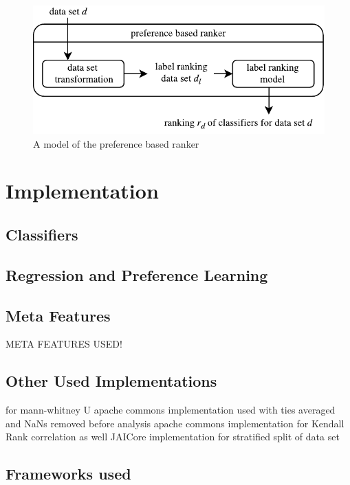 \begin{figure}
\centering
\includegraphics[scale=1]{gfx/label_ranking_model.pdf}
\caption{A model of the preference based ranker}
\label{fig:preference_ranker_model}
\end{figure}

\section{Implementation}

\subsection{Classifiers}

\subsection{Regression and Preference Learning}

\subsection{Meta Features}
META FEATURES USED! \cite{OpenML2013}

\subsection{Other Used Implementations}
for mann-whitney U apache commons implementation used with ties averaged and NaNs removed before analysis
apache commons implementation for Kendall Rank correlation as well
JAICore implementation for stratified split of data set

\subsection{Frameworks used}


